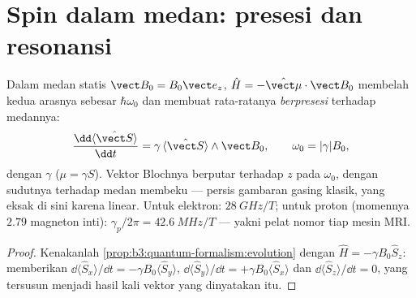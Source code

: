 \section{Spin dalam medan: presesi dan resonansi}

\begin{proposition}\label{prop:b3:spin-two-level:larmor}
Dalam medan statis $\vect B_0 = B_0\vect e_z$,  $\hat
H = -\hat{\vect\mu}\cdot\vect B_0$ membelah kedua arasnya sebesar
$\hbar\omega_0$ dan membuat  rata-ratanya \emph{berpresesi}
terhadap medannya:
\[
\frac{\dd\langle\hat{\vect S}\rangle}{\dd t} =
\gamma\,\langle\hat{\vect S}\rangle\wedge\vect B_0 , \qquad
\omega_0 = |\gamma|B_0 ,
\]
dengan  $\gamma$ ($\mu = \gamma S$). Vektor
Blochnya berputar terhadap $z$ pada $\omega_0$, dengan sudutnya terhadap
medan membeku --- persis gambaran gasing klasik, yang eksak di sini
karena  linear. Untuk elektron: $\qty{28}{GHz/T}$; untuk
proton (momennya $2.79$ magneton inti): $\gamma_p/2\pi =
\qty{42.6}{MHz/T}$ --- yakni pelat nomor tiap mesin MRI.
\end{proposition}

\begin{proof}
Kenakanlah \cref{prop:b3:quantum-formalism:evolution} dengan $\hat H =
-\gamma B_0\hat S_z$:  memberikan $\dd\langle\hat
S_x\rangle/\dd t = -\gamma B_0\langle\hat S_y\rangle$,
$\dd\langle\hat S_y\rangle/\dd t = +\gamma B_0\langle\hat
S_x\rangle$ dan $\dd\langle\hat S_z\rangle/\dd t = 0$, yang tersusun
menjadi hasil kali vektor yang dinyatakan itu.
\end{proof}

